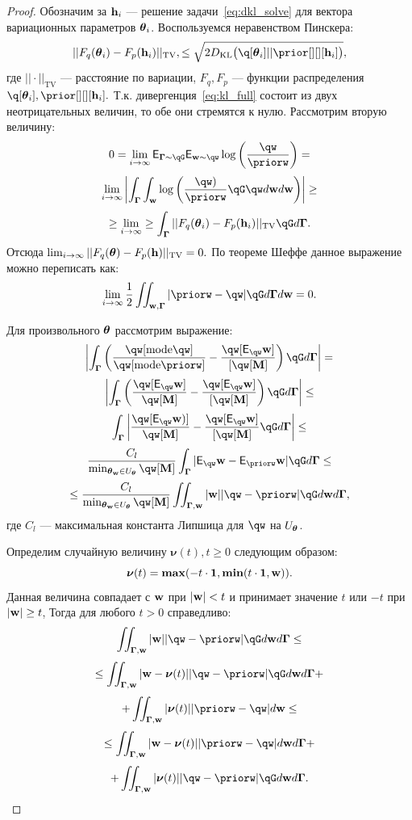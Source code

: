 \begin{proof}
Обозначим за $\mathbf{h}_i$ --- решение задачи~\eqref{eq:dkl_solve} для вектора вариационных параметров $\boldsymbol{\theta}_i$.
Воспользуемся неравенством Пинскера:
\[
    ||F_q(\teta_i)-F_p(\h_i)||_\text{TV},\leq\sqrt{2\KL{\q[\teta_i]}{\prior[][][\h_i]}},
\]
где $||\cdot||_\text{TV}$ --- расстояние по вариации, $F_q, F_p$ --- функции распределения   $\q[\teta_i],\prior[][][\h_i].$
Т.к. дивергенция~\eqref{eq:kl_full} состоит из двух неотрицательных величин, то обе они стремятся к нулю.
Рассмотрим вторую величину:
\[
  0 =   \lim_{i \to \infty} \E_{\G \sim \qG} \E_{\w \sim \qw} \log \left(\frac{\qw}{\priorw}\right) = 
\]
\[
 \lim_{i \to \infty} \left|\int_{\G} \int_{\w} \log \left(\frac{\qw)}{\priorw}\qG\qw d\w d\w\right) \right| \geq  
\]
\[
\geq \lim_{i \to \infty} \geq \int_{\G} ||F_q(\teta_i)-F_p(\h_i)||_\text{TV}\qG d\G.  
\]
Отсюда $ \lim_{i \to \infty} ||F_q(\boldsymbol{\theta})-F_p(\mathbf{h})||_\text{TV} = 0.$
По теореме Шеффе данное выражение можно переписать как:
\[
    \lim_{i \to \infty}   \frac{1}{2}\iint_{\w,\G} |\priorw - \qw| \qG d\G d\w = 0.
\]

Для произвольного $\boldsymbol{\theta}$ рассмотрим выражение:
\[
   \left|\int_{\G} \left(\frac{\qw[\text{mode}\qw]}{\qw[\text{mode}\priorw]} -  \frac{\qw[\E_{\qw} \w]}{[\qw[\mathbf{M}]} \right)\qG d\G \right| =
\]
\[  \left|\int_{\G} \left( \frac{\qw[\E_{\qw}\w]}{\qw[\mathbf{M}]} -  \frac{\qw[\E_{\qw} \w]}{[\qw[\mathbf{M}]} \right) \qG d\G\right| \leq 
\]
\[
\int_{\G} \left|\frac{\qw[\E_{\qw} \w)]}{{\qw[\mathbf{M}]}} -   \frac{\qw[\E_{\qw} \w]}{[\qw[\mathbf{M}]}\qG d\G\right| \leq
\]
\[
\frac{C_l}{\min_{\tetaw \in \Uteta} \qw[\mathbf{M}]}\int_{\G}  |\E_{\qw}\w - \E_{\priorw}\w|\qG d\G  \leq
\]
\[
    \leq \frac{C_l}{\min_{\tetaw \in \Uteta} \qw[\mathbf{M}]} \iint_{\G,\w} |\w| |\qw - \priorw|\qG d\w d\G,
\]
где $C_l$ --- максимальная константа Липшица для $\qw$ на $U_{\boldsymbol{\theta}}$. 

Определим случайную величину $\boldsymbol{\nu}(t), t \geq 0$ следующим образом:
\[
    \boldsymbol{\nu}(t) = \boldsymbol{\max}(-t \cdot \mathbf{1}, \boldsymbol{\min}(t \cdot \mathbf{1}, \mathbf{w})).
\]
Данная величина совпадает с $\mathbf{w}$ при $|\mathbf{w}| < t$ и принимает значение $t$ или $-t$ при $|\mathbf{w}| \geq t$,
Тогда для любого $t>0$ справедливо:
\[
    \iint_{\G,\w} |\w| |\qw - \priorw|\qG d\w d\G \leq
\]
\[ 
\leq  \iint_{\G,\w} |\w -\boldsymbol{\nu}(t)| |\qw - \priorw|\qG d\w d\G   +
\]
\[
 +    \iint_{\G,\w} |\boldsymbol{\nu}(t)||\priorw-\qw|d\w \leq
\]
\begin{equation}
\label{eq:tmp}
    \leq    \iint_{\G,\w} |\w -\boldsymbol{\nu}(t)||\priorw -\qw| d\w d\G   +
\end{equation}
\[ +      \iint_{\G,\w} |\boldsymbol{\nu}(t)| |\qw - \priorw|\qG d\w d\G.
\]


\end{proof}
